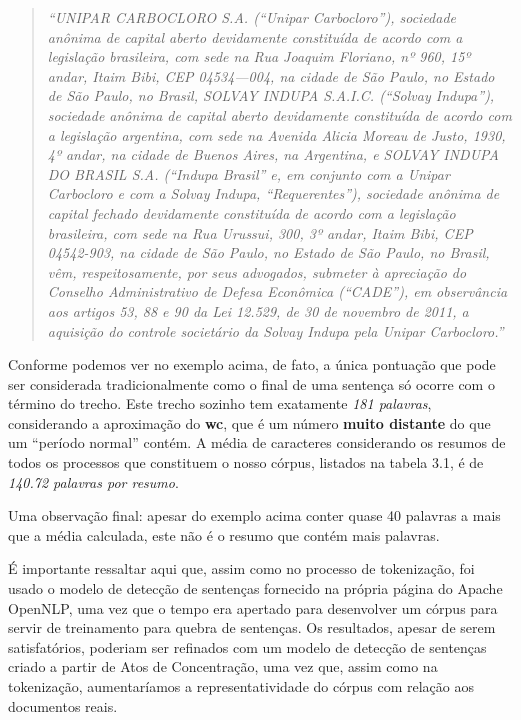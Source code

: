 \documentclass[11pt]{report}
\newcommand{\quotes}[1]{``#1''}
\begin{document}
\begin{quote}
  \textit{\quotes{UNIPAR CARBOCLORO S.A. (“Unipar Carbocloro”), sociedade anônima de capital aberto devidamente constituída de acordo com a legislação brasileira, com sede na Rua
  Joaquim Floriano, nº 960, 15º andar, Itaim Bibi, CEP 04534—004, na cidade de São Paulo, no Estado de São Paulo, no Brasil, SOLVAY INDUPA S.A.I.C. (“Solvay Indupa”),
  sociedade anônima de capital aberto devidamente constituída de acordo com a legislação argentina, com sede na Avenida Alicia Moreau de Justo, 1930, 4º andar, na cidade de
  Buenos Aires, na Argentina, e SOLVAY INDUPA DO BRASIL S.A. (“Indupa Brasil” e, em conjunto com a Unipar Carbocloro e com a Solvay Indupa, “Requerentes”), sociedade anônima
  de capital fechado devidamente constituída de acordo com a legislação brasileira, com sede na Rua Urussui, 300, 3º andar, Itaim Bibi, CEP 04542-903, na cidade de São Paulo,
  no Estado de São Paulo, no Brasil, vêm, respeitosamente, por seus advogados, submeter à apreciação do Conselho Administrativo de Defesa Econômica (“CADE”), em observância aos
  artigos 53, 88 e 90 da Lei 12.529, de 30 de novembro de 2011, a aquisição do controle societário da Solvay Indupa pela Unipar Carbocloro.}}
\end{quote}

Conforme podemos ver no exemplo acima, de fato, a única pontuação que pode ser considerada tradicionalmente como o final de uma sentença só ocorre com o término do trecho. Este trecho
sozinho tem exatamente \textit{181 palavras}, considerando a aproximação do \textbf{wc}, que é um número \textbf{muito distante} do que um \quotes{período normal} contém. A média
de caracteres considerando os resumos de todos os processos que constituem o nosso córpus, listados na tabela 3.1, é de \textit{140.72 palavras por resumo}.

Uma observação final: apesar do exemplo acima conter quase 40 palavras a mais que a média calculada, este não é o resumo que contém mais palavras.

É importante ressaltar aqui que, assim como no processo de tokenização, foi usado o modelo de detecção de sentenças fornecido na própria página do Apache OpenNLP, uma vez que o tempo era
apertado para desenvolver um córpus para servir de treinamento para quebra de sentenças. Os resultados, apesar de serem satisfatórios, poderiam ser refinados com um modelo
de detecção de sentenças criado a partir de Atos de Concentração, uma vez que, assim como na tokenização, aumentaríamos a representatividade do córpus com relação aos documentos
reais.
\end{document}
